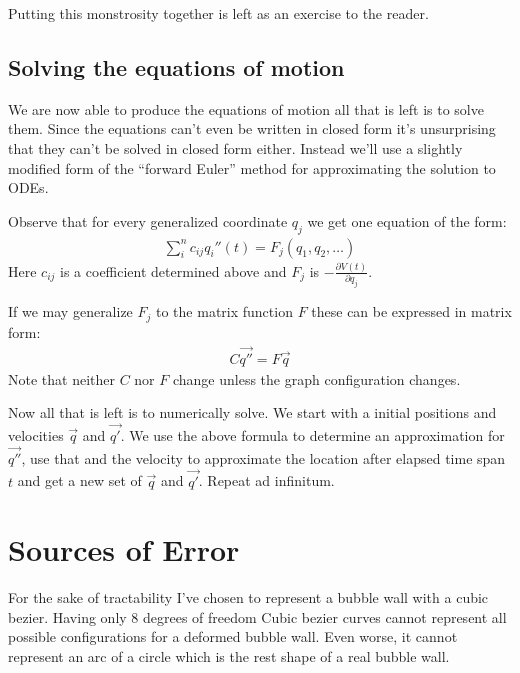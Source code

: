 \documentclass{article}
\begin{document}
Putting this monstrosity together is left as an exercise to the reader.
\subsection{Solving the equations of motion}
We are now able to produce the equations of motion all that is left is to solve
them. Since the equations can't even be written in closed form it's
unsurprising that they can't be solved in closed form either. Instead we'll
use a slightly modified form of the ``forward Euler'' method for approximating
the solution to ODEs.

Observe that for every generalized coordinate $q_j$ we get one equation of the
form:
\begin{align*}
\sum_i^n c_{ij}q_i''(t) = F_j(q_1,q_2,\ldots)
\end{align*}
Here $c_{ij}$ is a coefficient determined above and $F_j$ is
$-\frac{\partial V(t)}{\partial q_j}$.

If we may generalize $F_j$ to the matrix function $F$ these can be expressed in
matrix form:
\begin{align*}
C \vec{q''}= F \vec{q}
\end{align*}
Note that neither $C$ nor $F$ change unless the graph configuration changes.

Now all that is left is to numerically solve. We start with a initial positions
and velocities $\vec{q}$ and $\vec{q'}$. We use the above formula to determine
an approximation for $\vec{q''}$, use that and the velocity to approximate the
location after elapsed time span $t$ and get a new set of $\vec{q}$ and
$\vec{q'}$. Repeat ad infinitum.
\section{Sources of Error}
For the sake of tractability I've chosen to represent a bubble wall with a
cubic bezier. Having only 8 degrees of freedom Cubic bezier curves cannot
represent all possible configurations for a deformed bubble wall. Even
worse, it cannot represent an arc of a circle which is the rest shape of a real
bubble wall.
\end{document}
